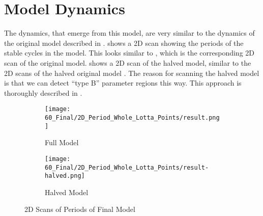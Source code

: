 \section{Model Dynamics}

The dynamics, that emerge from this model, are very similar to the dynamics of the original model described in .
 shows a 2D scan showing the periods of the stable cycles in the model.
This looks similar to , which is the corresponding 2D scan of the original model.
 shows a 2D scan of the halved model, similar to the 2D scans of the halved original model .
The reason for scanning the halved model is that we can detect ``type B'' parameter regions this way.
This approach is thoroughly described in .

\begin{figure}
    \centering
    \begin{subfigure}{0.4\textwidth}
        \centering
        \texttt{[image: 60\_Final/2D\_Period\_Whole\_Lotta\_Points/result.png]}
        \caption{Full Model}
        \label{fig:final.period.whole.full}
    \end{subfigure}
    \begin{subfigure}{0.4\textwidth}
        \centering
        \texttt{[image: 60\_Final/2D\_Period\_Whole\_Lotta\_Points/result-halved.png]}
        \caption{Halved Model}
        \label{fig:final.period.whole.halved}
    \end{subfigure}
    \caption{2D Scans of Periods of Final Model}
\end{figure}


